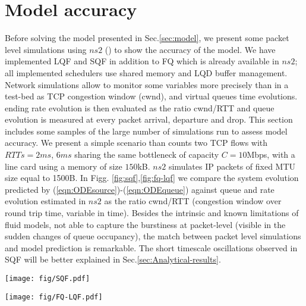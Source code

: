 \documentclass[a4paper,oneside, 11pt]{article}
\begin{document}
\section{Model accuracy}\label{sec:accuracy}
Before solving the model presented in Sec.\ref{sec:model}, we present some
packet level simulations using $ns2$ (\hspace{-0.2mm}\cite{ns2}) to show the accuracy of the
model.
We have implemented LQF and SQF in addition to FQ which is already available in $ns2$;
all implemented schedulers use shared memory and LQD buffer management.
Network simulations allow to monitor some variables more precisely than in a test-bed
as TCP congestion window (cwnd), and virtual queues time evolutions.
ending rate evolution is then evaluated as the ratio cwnd/RTT and queue evolution is
measured at every packet arrival, departure and drop.
This section includes some samples of the large number of simulations
run to assess model accuracy.
We present a simple scenario than counts two TCP flows with $RTTs=2ms$, $6ms$
sharing the same bottleneck of capacity $C=10$Mbps, with a line card
using a memory of size $150$kB. $ns2$ simulates IP packets of fixed MTU size
equal to 1500B.
In Figg. \ref{fig:sqf},\ref{fig:fq-lqf} we compare the system evolution
predicted by (\ref{eqn:ODEsource})-(\ref{eqn:ODEqueue}) against
queue and rate evolution estimated in $ns2$ as the ratio cwnd/RTT (congestion window over round trip time, variable in time).
Besides the intrinsic and known limitations of fluid models,  not able to
capture the burstiness at packet-level (visible in the sudden changes of queue occupancy),
the match between packet level simulations
and model prediction is remarkable.
The short timescale oscillations
observed in SQF will be better explained in Sec.\ref{sec:Analytical-results}.
\begin{figure*}[!htb]
\centering
\hspace{-2mm}\texttt{[image: fig/SQF.pdf]}
\caption{Time evolution of rates (top) and queues (bottom) under SQF: the model on the left,  $ns2$ on the right.}
\label{fig:sqf}
\end{figure*}
\begin{figure*}[!htb]
\texttt{[image: fig/FQ-LQF.pdf]}
\centering
\caption{Time evolution of rates and queues under FQ (top) and LQF (bottom): the model on the left,  $ns2$ on the right.}
\label{fig:fq-lqf}
\end{figure*}
\end{document}
